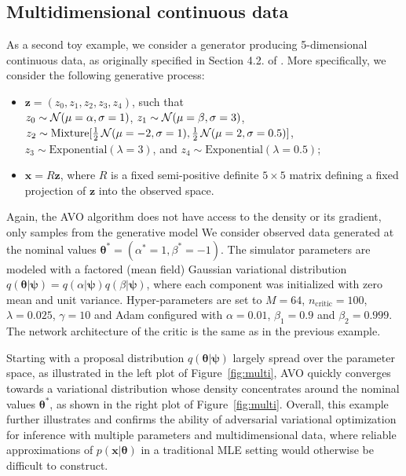 \documentclass[twocolumn,superscriptaddress,aps]{revtex4-1}
\newcommand{\bftheta}{{\bm \theta}}
\newcommand{\bfpsi}{{\bm \psi}}
\newcommand{\bfz}{\mathbf{z}}
\theoremstyle{plain}
\begin{document}
\subsection{Multidimensional continuous data}

As a second toy example, we consider a generator producing
5-dimensional continuous data, as originally specified in Section 4.2. of
\citep{cranmer2015approximating}. More specifically, we consider the following
generative process:
\begin{itemize}
    \item $\bfz = (z_0, z_1, z_2, z_3, z_4)$, such that \\
        $z_0 \sim {\cal N}(\mu=\alpha, \sigma=1)$,
        $z_1 \sim {\cal N}(\mu=\beta, \sigma=3)$,
        $z_2 \sim {\text{Mixture}}[\frac{1}{2}\,{\cal N}(\mu=-2, \sigma=1), \\  \frac{1}{2}\,{\cal N}(\mu=2, \sigma=0.5)]$,
        $z_3 \sim {\text{Exponential}(\lambda=3)}$, and
        $z_4 \sim {\text{Exponential}(\lambda=0.5)}$;
    \item $\mathbf{x} = R  \bfz$, where $R$ is a fixed
    semi-positive definite $5 \times 5$ matrix defining a fixed projection
    of $\bfz$ into the observed space.
\end{itemize}
Again, the AVO algorithm does not have access to the density or its gradient, only samples from the generative model
We consider observed data generated at the nominal values $\bftheta^* = (\alpha^*=1,\beta^*=-1)$.
The simulator parameters are modeled with a factored  (mean field) Gaussian
variational distribution $q(\bftheta|\bfpsi) = q(\alpha|\bfpsi) q(\beta|\bfpsi)$, where each component was
initialized with zero mean and unit variance.
Hyper-parameters are set to $M=64$, $n_\text{critic}=100$, $\lambda=0.025$, $\gamma=10$ and
Adam configured with $\alpha=0.01$, $\beta_1=0.9$ and $\beta_2=0.999$.
The network architecture of the critic is the same as in the previous example.


Starting with a proposal distribution $q(\bftheta|\bfpsi)$ largely spread over
the parameter space, as illustrated in the left plot of Figure~\ref{fig:multi},
AVO quickly converges towards a variational distribution whose density
concentrates around the nominal values $\bftheta^*$, as shown in the right plot of Figure~\ref{fig:multi}.
Overall, this example further illustrates and confirms the ability of adversarial
variational optimization for inference with multiple parameters and multidimensional
data, where reliable approximations of $p(\mathbf{x}|\bftheta)$ in a traditional
MLE setting would otherwise be difficult to construct.
\end{document}

